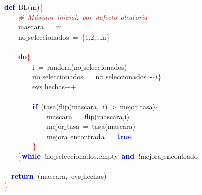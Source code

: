 \noindent
\mbox{}\textbf{\textcolor{Blue}{def}}\ BL\textcolor{BrickRed}{(}m\textcolor{BrickRed}{)}\textcolor{Red}{\{} \\
\mbox{}\ \ \ \ \textit{\textcolor{Brown}{\#\ Máscara\ inicial,\ por\ defecto\ aleatoria}} \\
\mbox{}\ \ \ \ mascara\ \textcolor{BrickRed}{=}\ m \\
\mbox{}\ \ \ \ no$\_$seleccionados\ \textcolor{BrickRed}{=}\ \textcolor{Red}{\{}\textcolor{Purple}{1}\textcolor{BrickRed}{,}\textcolor{Purple}{2}\textcolor{BrickRed}{,...}n\textcolor{Red}{\}} \\
\mbox{} \\
\mbox{}\ \ \ \ \textbf{\textcolor{Blue}{do}}\textcolor{Red}{\{} \\
\mbox{}\ \ \ \ \ \ \ \ i\ \textcolor{BrickRed}{=}\ random\textcolor{BrickRed}{(}no$\_$seleccionados\textcolor{BrickRed}{)} \\
\mbox{}\ \ \ \ \ \ \ \ no$\_$seleccionados\ \textcolor{BrickRed}{=}\ no$\_$seleccionados\ \textcolor{BrickRed}{-}\textcolor{Red}{\{}i\textcolor{Red}{\}} \\
\mbox{}\ \ \ \ \ \ \ \ evs$\_$hechas\textcolor{BrickRed}{++} \\
\mbox{} \\
\mbox{}\ \ \ \ \ \ \ \ \textbf{\textcolor{Blue}{if}}\ \textcolor{BrickRed}{(}tasa\textcolor{BrickRed}{(}flip\textcolor{BrickRed}{(}mascara\textcolor{BrickRed}{,}\ i\textcolor{BrickRed}{)}\ \textcolor{BrickRed}{\textgreater{}}\ mejor$\_$tasa\textcolor{BrickRed}{)}\textcolor{Red}{\{} \\
\mbox{}\ \ \ \ \ \ \ \ \ \ \ \ mascara\ \textcolor{BrickRed}{=}\ flip\textcolor{BrickRed}{(}mascara\textcolor{BrickRed}{,}i\textcolor{BrickRed}{)} \\
\mbox{}\ \ \ \ \ \ \ \ \ \ \ \ mejor$\_$tasa\ \textcolor{BrickRed}{=}\ tasa\textcolor{BrickRed}{(}mascara\textcolor{BrickRed}{)} \\
\mbox{}\ \ \ \ \ \ \ \ \ \ \ \ mejora$\_$encontrada\ \textcolor{BrickRed}{=}\ \textbf{\textcolor{Blue}{true}} \\
\mbox{}\ \ \ \ \ \ \ \ \textcolor{Red}{\}} \\
\mbox{}\ \ \ \ \textcolor{Red}{\}}\textbf{\textcolor{Blue}{while}}\ \textcolor{BrickRed}{!}no$\_$seleccionados\textcolor{BrickRed}{.}empty\ \textbf{\textcolor{Blue}{and}}\ \textcolor{BrickRed}{!}mejora$\_$encontrado \\
\mbox{} \\
\mbox{}\ \ \textbf{\textcolor{Blue}{return}}\ \textcolor{BrickRed}{(}mascara\textcolor{BrickRed}{,}\ evs$\_$hechas\textcolor{BrickRed}{)} \\
\mbox{}\textcolor{Red}{\}} \\
\mbox{}
